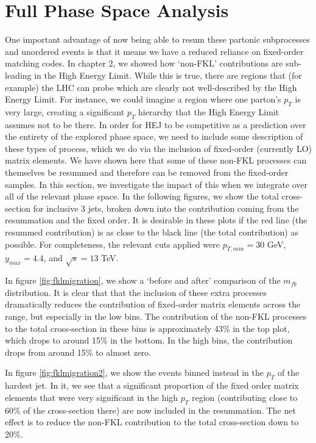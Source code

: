\section{Full Phase Space Analysis}

One important advantage of now being able to resum these partonic subprocesses and unordered events is that it means we have a reduced reliance on fixed-order matching codes. In chapter 2, we showed how `non-FKL' contributions are sub-leading in the High Energy Limit. While this is true, there are regions that (for example) the LHC can probe which are clearly not well-described by the High Energy Limit. For instance, we could imagine a region where one parton's $p_T$ is very large, creating a significant $p_T$ hierarchy that the High Energy Limit assumes not to be there. In order for HEJ to be competitive as a prediction over the entirety of the explored phase space, we need to include some description of these types of process, which we do via the inclusion of fixed-order (currently LO) matrix elements. We have shown here that some of these non-FKL processes can themselves be resummed and therefore can be removed from the fixed-order samples. In this section, we investigate the impact of this when we integrate over all of the relevant phase space. In the following figures, we show the total cross-section for inclusive 3 jets, broken down into the contribution coming from the resummation and the fixed order. It is desirable in these plots if the red line (the resummed contribution) is as close to the black line (the total contribution) as possible. For completeness, the relevant cuts applied were $p_{T,min} = 30$ GeV, $y_{max} = 4.4$, and $\sqrt{s} = 13$ TeV. 

In figure \ref{fig:fklmigration}, we show a `before and after' comparison of the $m_{fb}$ distribution. It is clear that that the inclusion of these extra processes dramatically reduces the contribution of fixed-order matrix elements across the range, but especially in the low bins. The contribution of the non-FKL processes to the total cross-section in these bins is approximately 43\% in the top plot, which drops to around 15\% in the bottom. In the high bins, the contribution drops from around 15\% to almost zero. 

In figure \ref{fig:fklmigration2}, we show the events binned instead in the $p_T$ of the hardest jet. In it, we see that a significant proportion of the fixed order matrix elements that were very significant in the high $p_T$ region (contributing close to 60\% of the cross-section there) are now included in the resummation. The net effect is to reduce the non-FKL contribution to the total cross-section down to 20\%. 

